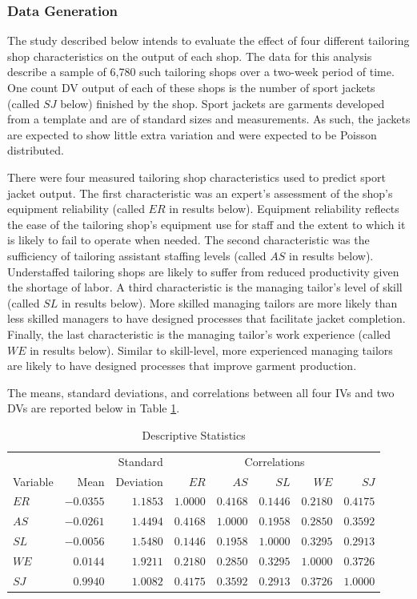 \documentclass[ShortAfour,times,sageapa]{sagej}
\begin{document}
		\subsubsection{Data Generation}
	
	The study described below intends to evaluate the effect of four different tailoring shop characteristics on the output of each shop.
	The data for this analysis describe a sample of 6,780 such tailoring shops over a two-week period of time.
	One count DV output of each of these shops is the number of sport jackets (called $SJ$ below) finished by the shop.
	Sport jackets are garments developed from a template and are of standard sizes and measurements.
	As such, the jackets are expected to show little extra variation and were expected to be Poisson distributed.
	
	There were four measured tailoring shop characteristics used to predict sport jacket output. 
	The first characteristic was an expert's assessment of the shop's equipment reliability (called $ER$ in results below).
	Equipment reliability reflects the ease of the tailoring shop's equipment use for staff and the extent to which it is likely to fail to operate when needed. 
	The second characteristic was the sufficiency of tailoring assistant staffing levels (called $AS$ in results below).
	Understaffed tailoring shops are likely to suffer from reduced productivity given the shortage of labor.
	A third characteristic is the managing tailor's level of skill (called $SL$ in results below).
	More skilled managing tailors are more likely than less skilled managers to have designed processes that facilitate jacket completion.
	Finally, the last characteristic is the managing tailor's work experience (called $WE$ in results below).
	Similar to skill-level, more experienced managing tailors are likely to have designed processes that improve garment production.
	
	The means, standard deviations, and correlations between all four IVs and two DVs are reported below in Table \ref{tab:desc}. 
	
	\begin{table}[h!]
		\centering
		\caption{\centering Descriptive Statistics} 
		\begin{tabular}{lrr|rrrrr}
			\toprule
			&  & Standard & \multicolumn{5}{c}{Correlations} \\ 
			\cmidrule(lr){4-8}
			Variable & Mean & Deviation & $ER$ & $AS$ & $SL$ & $WE$ & $SJ$ \\ 
			\midrule
			$ER$ & $-0.0355$ & $1.1853$ & $1.0000$ & $0.4168$ & $0.1446$ & $0.2180$ & $0.4175$ \\ 
			$AS$ & $-0.0261$ & $1.4494$ & $0.4168$ & $1.0000$ & $0.1958$ & $0.2850$ & $0.3592$ \\ 
			$SL$ & $-0.0056$ & $1.5480$ & $0.1446$ & $0.1958$ & $1.0000$ & $0.3295$ & $0.2913$ \\ 
			$WE$ & $0.0144$ & $1.9211$ & $0.2180$ & $0.2850$ & $0.3295$ & $1.0000$ & $0.3726$ \\ 
			$SJ$ & $0.9940$ & $1.0082$ & $0.4175$ & $0.3592$ & $0.2913$ & $0.3726$ & $1.0000$ \\ 
			\bottomrule
		\end{tabular}
		\label{tab:desc}
	\end{table}
\end{document}

